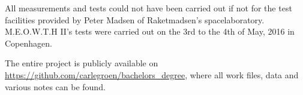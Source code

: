 All measurements and tests could not have been carried out if not for the test facilities provided by Peter Madsen of Raketmadsen's spacelaboratory. M.E.O.W.T.H II's tests were carried out on the 3rd to the 4th of May, 2016 in Copenhagen.

The entire project is publicly available on \url{https://github.com/carlegroen/bachelors_degree}, where all work files, data and various notes can be found.
